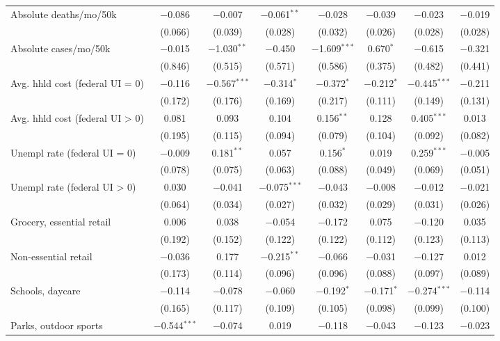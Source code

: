 \begin{table}[!htbp]
\begin{tabular}{@{\extracolsep{5pt}}lccccccc}
 Absolute deaths/mo/50k & $-$0.086 & $-$0.007 & $-$0.061$^{**}$ & $-$0.028 & $-$0.039 & $-$0.023 & $-$0.019 \\ 
  & (0.066) & (0.039) & (0.028) & (0.032) & (0.026) & (0.028) & (0.028) \\ 
  Absolute cases/mo/50k & $-$0.015 & $-$1.030$^{**}$ & $-$0.450 & $-$1.609$^{***}$ & 0.670$^{*}$ & $-$0.615 & $-$0.321 \\ 
  & (0.846) & (0.515) & (0.571) & (0.586) & (0.375) & (0.482) & (0.441) \\ 
  Avg. hhld cost (federal UI = 0) & $-$0.116 & $-$0.567$^{***}$ & $-$0.314$^{*}$ & $-$0.372$^{*}$ & $-$0.212$^{*}$ & $-$0.445$^{***}$ & $-$0.211 \\ 
  & (0.172) & (0.176) & (0.169) & (0.217) & (0.111) & (0.149) & (0.131) \\ 
  Avg. hhld cost (federal UI > 0) & 0.081 & 0.093 & 0.104 & 0.156$^{**}$ & 0.128 & 0.405$^{***}$ & 0.013 \\ 
  & (0.195) & (0.115) & (0.094) & (0.079) & (0.104) & (0.092) & (0.082) \\ 
  Unempl rate (federal UI = 0) & $-$0.009 & 0.181$^{**}$ & 0.057 & 0.156$^{*}$ & 0.019 & 0.259$^{***}$ & $-$0.005 \\ 
  & (0.078) & (0.075) & (0.063) & (0.088) & (0.049) & (0.069) & (0.051) \\ 
  Unempl rate (federal UI > 0) & 0.030 & $-$0.041 & $-$0.075$^{***}$ & $-$0.043 & $-$0.008 & $-$0.012 & $-$0.021 \\ 
  & (0.064) & (0.034) & (0.027) & (0.032) & (0.029) & (0.031) & (0.026) \\ 
  Grocery, essential retail & 0.006 & 0.038 & $-$0.054 & $-$0.172 & 0.075 & $-$0.120 & 0.035 \\ 
  & (0.192) & (0.152) & (0.122) & (0.122) & (0.112) & (0.123) & (0.113) \\ 
  Non-essential retail & $-$0.036 & 0.177 & $-$0.215$^{**}$ & $-$0.066 & $-$0.031 & $-$0.127 & 0.012 \\ 
  & (0.173) & (0.114) & (0.096) & (0.096) & (0.088) & (0.097) & (0.089) \\ 
  Schools, daycare & $-$0.114 & $-$0.078 & $-$0.060 & $-$0.192$^{*}$ & $-$0.171$^{*}$ & $-$0.274$^{***}$ & $-$0.114 \\ 
  & (0.165) & (0.117) & (0.109) & (0.105) & (0.098) & (0.099) & (0.100) \\ 
  Parks, outdoor sports & $-$0.544$^{***}$ & $-$0.074 & 0.019 & $-$0.118 & $-$0.043 & $-$0.123 & $-$0.023 \\ 

\end{tabular}
\end{table}
